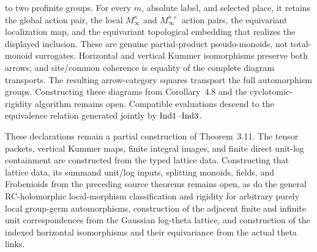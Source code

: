 \begin{definition}
  to two profinite groups.  For every \(m\), absolute label, and selected place,
  it retains the global action pair, the local \(M_\infty^\kappa\) and
  \(M_\infty^{\kappa\times}\) action pairs, the equivariant localization map,
  and the equivariant topological embedding that realizes the displayed
  inclusion.  These are genuine partial-product
  pseudo-monoids, not total-monoid surrogates.  Horizontal and vertical Kummer
  isomorphisms preserve both arrows, and site/common coherence is equality of
  the complete diagram transports.  The resulting arrow-category squares
  transport the full automorphism groups.  Constructing these diagrams from
  Corollary~4.8 and the cyclotomic-rigidity algorithm remains open.
  Compatible evaluations descend
  to the equivalence relation generated jointly by \(\mathrm{Ind1}\)--\(\mathrm{Ind3}\).

  These declarations remain a partial construction of Theorem~3.11.  The
  tensor packets, vertical Kummer maps, finite integral images, and finite
  direct unit-log containment are constructed from the typed lattice data.
  Constructing that lattice data, its summand unit/log inputs, splitting
  monoids, fields, and Frobenioids from the preceding source theorems remains
  open, as do the general RC-holomorphic local-morphism classification and
  rigidity for arbitrary purely local group-germ automorphisms,
  construction of the adjacent finite and infinite unit correspondences from
  the Gaussian log-theta lattice, and construction of the indexed horizontal
  isomorphisms and their equivariance from the actual theta links.
\end{definition}

